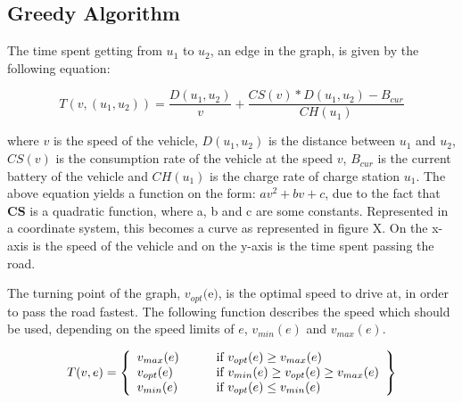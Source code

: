 \subsection{Greedy Algorithm}

The time spent getting from $u_1$ to $u_2$, an edge in the graph, is given by the following equation:

\[T(v,(u_1, u_2)) = \frac{D(u_1, u_2)}{v} + \frac{CS(v) * D(u_1, u_2) - B_{cur}}{CH(u_1)}\]



where $v$ is the speed of the vehicle, $D(u_1, u_2)$ is the distance between $u_1$ and $u_2$, 
$CS(v)$ is the consumption rate of the vehicle at the speed $v$, $B_{cur}$ is the current battery
of the vehicle and $CH(u_1)$ is the charge rate of charge station $u_1$. The above equation yields 
a function on the form: $av^2 + bv + c$, due to the fact that $\textbf{CS}$ is a quadratic function, 
where a, b and c are some constants. Represented in a coordinate system, this becomes a curve as 
represented in figure X. On the x-axis is the speed of the vehicle and on the y-axis is the time 
spent passing the road. 

The turning point of the graph, $v_{opt}($e$)$, is the optimal speed to drive at, 
in order to pass the road fastest. The following function describes the speed which should be used, depending on the speed limits of $e$, $v_{min}(e)$ and $v_{max}(e)$.

\[ T(v, e) = \left\{ 
  \begin{array}{l l l}
    v_{max}(e) & \qquad \text{if $v_{opt}(e) \geq v_{max}(e)$}\\
    v_{opt}(e) & \qquad \text{if $v_{min}(e) \geq v_{opt}(e) \geq v_{max}(e)$}\\
    v_{min}(e) & \qquad \text{if $v_{opt}(e) \leq v_{min}(e)$}
  \end{array} \right\} \]
